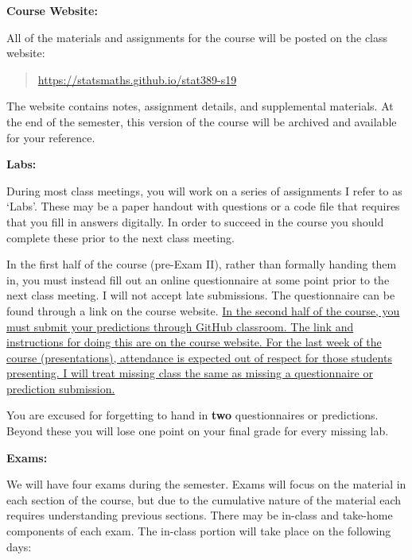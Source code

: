 \documentclass[12pt]{article}
\begin{document}
\bigskip

\textbf{Course Website:} \vspace{6pt}

All of the materials and assignments for the course will be posted
on the class website:
\begin{quote}
\url{https://statsmaths.github.io/stat389-s19}
\end{quote}
The website contains notes, assignment details, and supplemental materials.
At the end of the semester, this version of the course will be archived and
available for your reference.

\vspace{0.4cm}

\textbf{Labs:} \vspace{6pt}

During most class meetings, you will work on a series of assignments I refer
to as `Labs'. These may be a paper handout with questions or a code file that
requires that you fill in answers digitally. In order to succeed in the course
you should complete these prior to the next class meeting.

\medskip

In the first half of the course (pre-Exam II), rather than
formally handing them in, you must instead fill out an online questionnaire
at some point prior to the next class meeting. I will not accept late
submissions. The questionnaire can be found through a link on the course
website. \ul{In the second half of the course, you must submit your predictions
through GitHub classroom. The link and instructions for doing this are on the
course website. For the last week of the course (presentations), attendance is
expected out of
respect for those students presenting. I will treat missing class the same as
missing a questionnaire or prediction submission.}

\medskip

You are excused for forgetting to hand in \textbf{two} questionnaires or
predictions. Beyond these you will lose one point on your final grade for
every missing lab.

\vspace{0.4cm}

\textbf{Exams:} \vspace{6pt}

We will have four exams during the semester. Exams will focus on
the material in each section of the course, but due to the cumulative nature
of the material each requires understanding previous sections. There may be
in-class and take-home components of each exam. The in-class portion will take
place on the following days:
\end{document}
